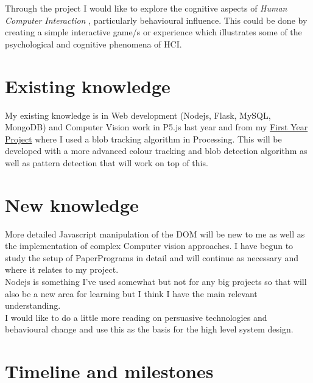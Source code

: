 \documentclass[11pt]{article}
\begin{document}
Through the project I would like to explore the cognitive aspects of \emph{Human Computer Interaction} \cite{SharpHelen2019IDBH}, particularly behavioural influence. This could be done by creating a simple interactive game/s or experience which illustrates some of the psychological and cognitive phenomena of HCI.\\

\section*{Existing knowledge}
\label{sec:org630fc51}

My existing knowledge is in Web development (Nodejs, Flask, MySQL, MongoDB) and Computer Vision work in P5.js last year and from my \href{https://github.com/locua/CPY1-code-experiment-with-colour--and-sound}{First Year Project} where I used a blob tracking algorithm in Processing. This will be developed with a more advanced colour tracking and blob detection algorithm as well as  pattern detection that will work on top of this.\\

\section*{New knowledge}
\label{sec:orgaad3af6}

More detailed Javascript manipulation of the DOM will be new to me as well as the implementation of complex Computer vision approaches. I have begun to study the setup of PaperPrograms in detail and will continue as necessary and where it relates to my project.\\

Nodejs is something I've used somewhat but not for any big projects so that will also be a new area for learning but I think I have the main relevant understanding.\\

I would like to do a little more reading \cite{Li-HsingShih2016PDfP,2005CACL}  on persuasive technologies and behavioural change and use this as the basis for the high level system design.\\

\section*{Timeline and milestones}
\label{sec:org6a33107}
\end{document}
